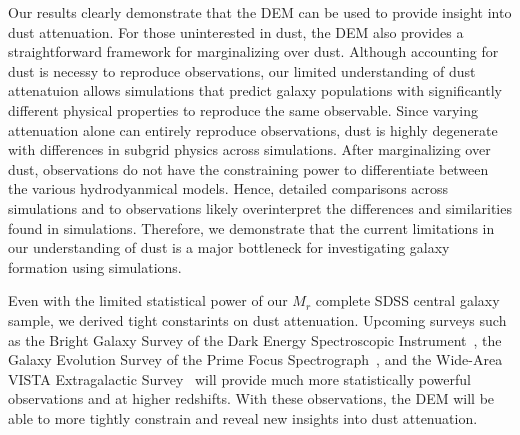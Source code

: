 Our results clearly demonstrate that the DEM can be used to provide insight
into dust attenuation. For those uninterested in dust, the DEM also provides 
a straightforward framework for marginalizing over dust. Although accounting
for dust is necessy to reproduce observations, our limited understanding of
dust attenatuion allows simulations that predict galaxy populations with
significantly different physical properties to reproduce the same observable. Since varying attenuation alone
can entirely reproduce observations, dust is highly degenerate with differences
in subgrid physics across simulations. After marginalizing over dust, observations do not have the
constraining power to differentiate between the various hydrodyanmical models.
Hence, detailed comparisons across simulations and to observations likely 
overinterpret the differences and similarities found in simulations. Therefore, 
we demonstrate that the current limitations in our understanding of dust is a 
major bottleneck for investigating galaxy formation using simulations.

Even with the limited statistical power of our $M_r$ complete SDSS central
galaxy sample, we derived tight constarints on dust attenuation. Upcoming
surveys such as the Bright Galaxy Survey of the Dark Energy Spectroscopic
Instrument~\citep[DESI;][]{desicollaboration2016}, the Galaxy
Evolution Survey of the Prime Focus
Spectrograph~\citep[PFS;][]{takada2014,tamura2016}, and the Wide-Area VISTA
Extragalactic Survey~\citep[WAVES;][]{driver2016, driver2019} will provide
much more statistically powerful observations and at higher redshifts. With 
these observations, the DEM will be able to more tightly constrain and reveal 
new insights into dust attenuation. 



